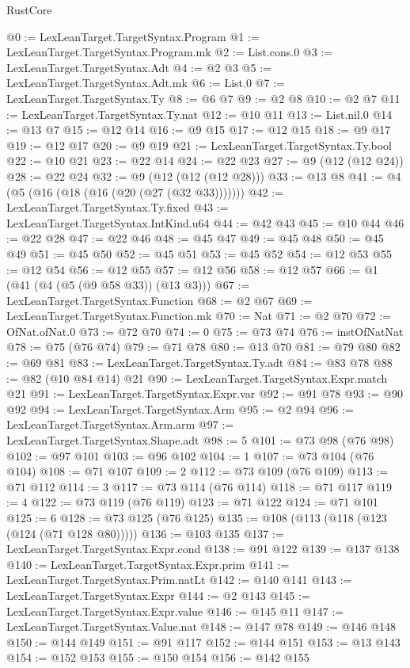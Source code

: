 \begin{lexlean}{RustCore}
\begin{coremodule}
@0 := LexLeanTarget.TargetSyntax.Program
@1 := LexLeanTarget.TargetSyntax.Program.mk
@2 := List.cons.{0}
@3 := LexLeanTarget.TargetSyntax.Adt
@4 := @2 @3
@5 := LexLeanTarget.TargetSyntax.Adt.mk
@6 := List.{0}
@7 := LexLeanTarget.TargetSyntax.Ty
@8 := @6 @7
@9 := @2 @8
@10 := @2 @7
@11 := LexLeanTarget.TargetSyntax.Ty.nat
@12 := @10 @11
@13 := List.nil.{0}
@14 := @13 @7
@15 := @12 @14
@16 := @9 @15
@17 := @12 @15
@18 := @9 @17
@19 := @12 @17
@20 := @9 @19
@21 := LexLeanTarget.TargetSyntax.Ty.bool
@22 := @10 @21
@23 := @22 @14
@24 := @22 @23
@27 := @9 (@12 (@12 @24))
@28 := @22 @24
@32 := @9 (@12 (@12 (@12 @28)))
@33 := @13 @8
@41 := @4 (@5 (@16 (@18 (@16 (@20 (@27 (@32 @33)))))))
@42 := LexLeanTarget.TargetSyntax.Ty.fixed
@43 := LexLeanTarget.TargetSyntax.IntKind.u64
@44 := @42 @43
@45 := @10 @44
@46 := @22 @28
@47 := @22 @46
@48 := @45 @47
@49 := @45 @48
@50 := @45 @49
@51 := @45 @50
@52 := @45 @51
@53 := @45 @52
@54 := @12 @53
@55 := @12 @54
@56 := @12 @55
@57 := @12 @56
@58 := @12 @57
@66 := @1 (@41 (@4 (@5 (@9 @58 @33)) (@13 @3)))
@67 := LexLeanTarget.TargetSyntax.Function
@68 := @2 @67
@69 := LexLeanTarget.TargetSyntax.Function.mk
@70 := Nat
@71 := @2 @70
@72 := OfNat.ofNat.{0}
@73 := @72 @70
@74 := 0
@75 := @73 @74
@76 := instOfNatNat
@78 := @75 (@76 @74)
@79 := @71 @78
@80 := @13 @70
@81 := @79 @80
@82 := @69 @81
@83 := LexLeanTarget.TargetSyntax.Ty.adt
@84 := @83 @78
@88 := @82 (@10 @84 @14) @21
@90 := LexLeanTarget.TargetSyntax.Expr.match @21
@91 := LexLeanTarget.TargetSyntax.Expr.var
@92 := @91 @78
@93 := @90 @92
@94 := LexLeanTarget.TargetSyntax.Arm
@95 := @2 @94
@96 := LexLeanTarget.TargetSyntax.Arm.arm
@97 := LexLeanTarget.TargetSyntax.Shape.adt
@98 := 5
@101 := @73 @98 (@76 @98)
@102 := @97 @101
@103 := @96 @102
@104 := 1
@107 := @73 @104 (@76 @104)
@108 := @71 @107
@109 := 2
@112 := @73 @109 (@76 @109)
@113 := @71 @112
@114 := 3
@117 := @73 @114 (@76 @114)
@118 := @71 @117
@119 := 4
@122 := @73 @119 (@76 @119)
@123 := @71 @122
@124 := @71 @101
@125 := 6
@128 := @73 @125 (@76 @125)
@135 := @108 (@113 (@118 (@123 (@124 (@71 @128 @80)))))
@136 := @103 @135
@137 := LexLeanTarget.TargetSyntax.Expr.cond
@138 := @91 @122
@139 := @137 @138
@140 := LexLeanTarget.TargetSyntax.Expr.prim
@141 := LexLeanTarget.TargetSyntax.Prim.natLt
@142 := @140 @141
@143 := LexLeanTarget.TargetSyntax.Expr
@144 := @2 @143
@145 := LexLeanTarget.TargetSyntax.Expr.value
@146 := @145 @11
@147 := LexLeanTarget.TargetSyntax.Value.nat
@148 := @147 @78
@149 := @146 @148
@150 := @144 @149
@151 := @91 @117
@152 := @144 @151
@153 := @13 @143
@154 := @152 @153
@155 := @150 @154
@156 := @142 @155

\end{coremodule}
\end{lexlean}
